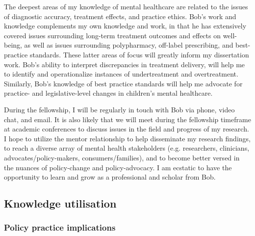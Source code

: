 \documentclass[twocolumn, issue, rga, authordate]{jote-new-article}
\begin{document}
The deepest areas of my knowledge of mental healthcare are related to
the issues of diagnostic accuracy, treatment effects, and practice
ethics. Bob's work and knowledge complements my own knowledge and work,
in that he has extensively covered issues surrounding long-term
treatment outcomes and effects on well-being, as well as issues
surrounding polypharmacy, off-label prescribing, and best-practice
standards. These latter areas of focus will greatly inform my
dissertation work. Bob's ability to interpret discrepancies in treatment
delivery, will help me to identify and operationalize instances of
undertreatment and overtreatment. Similarly, Bob's knowledge of best
practice standards will help me advocate for practice- and
legislative-level changes in children's mental healthcare.

During the fellowship, I will be regularly in touch with Bob via phone,
video chat, and email. It is also likely that we will meet during the
fellowship timeframe at academic conferences to discuss issues in the
field and progress of my research. I hope to utilize the mentor
relationship to help disseminate my research findings, to reach a
diverse array of mental health stakeholders (e.g. researchers,
clinicians, advocates/policy-makers, consumers/families), and to become
better versed in the nuances of policy-change and policy-advocacy. I am
ecstatic to have the opportunity to learn and grow as a professional and
scholar from Bob.


\subsection{Knowledge utilisation}



\subsubsection{Policy practice implications}
\end{document}
